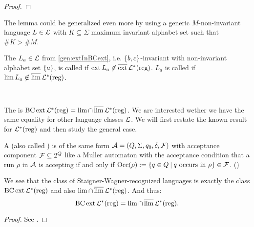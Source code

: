 \begin{theorem}
\begin{proof}
%
\end{proof}
\end{theorem}

The lemma could be generalized even more by using a generic $M$-non-invariant language $L \in \mathcal{L}$ with $K \subseteq \Sigma$ maximum invariant alphabet set such that $\#K > \#M$.

\begin{mydef}
The $L_a \in \mathcal{L}$ from \cref{gen:extInBCext}, i.e. $\Set{b,c}$-invariant with non-invariant alphabet set $\Set{a}$, is called  if $\operatorname{ext} L_a \not\in \operatorname{\overline{ext}} \mathcal{L}^*(\text{reg})$. $L_a$ is called  if $\lim L_a \not\in \operatorname{\overline{lim}} \mathcal{L}^*(\text{reg})$.
\end{mydef}

\

The  is $\operatorname{BC} \operatorname{ext} \mathcal{L}^*(\text{reg}) = \lim \cap \operatorname{\overline{lim}} \mathcal{L}^*(\text{reg})$. We are interested wether we have the same equality for other language classes $\mathcal{L}$. We will first restate the known result for $\mathcal{L}^*(\text{reg})$ and then study the general case.

\begin{mydef}
\label{def:staiger-wagner}
A  (also called ) is of the same form $\mathcal{A} = (Q,\Sigma,q_0,\delta,\mathcal{F})$ with acceptance component $\mathcal{F} \subseteq 2^Q$ like a Muller automaton with the acceptance condition that a run $\rho$ in $\mathcal{A}$ is accepting if and only if $\Occ(\rho) := \Set{q \in Q}{\text{$q$ occurs in $\rho$}} \in \F$.  (\cite[Def.61, p.43]{InfCompR101})
\end{mydef}

\begin{theorem}
\label{thm:staiger-wagner}
We see that the class of Staigner-Wagner-recognized languages is exactly the class $\operatorname{BC} \operatorname{ext} \mathcal{L}^*(\text{reg})$ and also $\lim \cap \operatorname{\overline{lim}} \mathcal{L}^*(\text{reg})$. And thus:
\[ \operatorname{BC} \operatorname{ext} \mathcal{L}^*(\text{reg}) = \lim \cap \operatorname{\overline{lim}} \mathcal{L}^*(\text{reg}) . \]
\begin{proof}
See \cite[Theorem 63+64, p.44]{InfCompR101}.
\end{proof}
\end{theorem}

